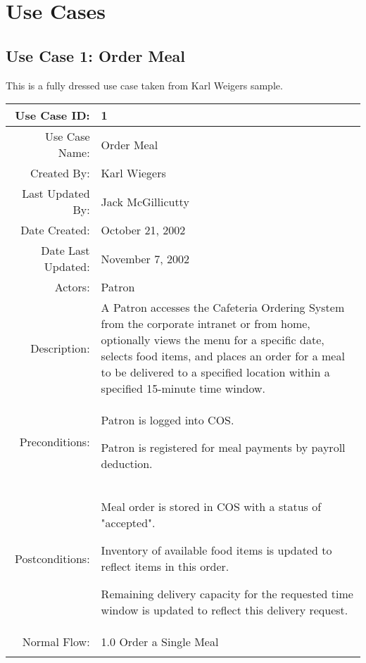 \documentclass[12pt,oneside,letterpaper]{article}
\newenvironment{packed_enumerate}{ %
\vspace{-7mm}
\begin{enumerate}
  \setlength{\itemsep}{0pt}
  \setlength{\parskip}{0pt}
  \setlength{\parsep}{0pt}
}{\end{enumerate}
\vspace{-8mm}}
\begin{document}
\section{Use Cases}

\subsection{\label{Order Meal}Use Case 1: Order Meal}
This is a fully dressed use case taken from Karl Weigers sample.

\begin{longtable}{|r|p{3.8in}|}
\hline
Use Case ID:&1\\
\hline
Use Case Name:&Order Meal\\
\hline
Created By:&Karl Wiegers\\
\hline
Last Updated By:&Jack McGillicutty\\
\hline
Date Created:&October 21, 2002\\
\hline
Date Last Updated:&November 7, 2002\\
\hline
Actors:&Patron\\
\hline
Description:&A Patron accesses the Cafeteria Ordering System from the corporate intranet or from home, optionally views the menu for a specific date, selects food items, and places an order for a meal to be delivered to a specified location within a specified 15-minute time window.\\
\hline
Preconditions:&
\begin{packed_enumerate}
\item Patron is logged into COS.
\item Patron is registered for meal payments by payroll deduction.
\end{packed_enumerate}\\
\hline
Postconditions:&
\begin{packed_enumerate}
\item Meal order is stored in COS with a status of "accepted".
\item Inventory of available food items is updated to reflect items in this order.
\item Remaining delivery capacity for the requested time window is updated to reflect this delivery request.
\end{packed_enumerate}\\
\hline
Normal Flow:&1.0 Order a Single Meal\\
&  %
\begin{packed_enumerate}

\end{packed_enumerate}
\end{longtable}
\end{document}

